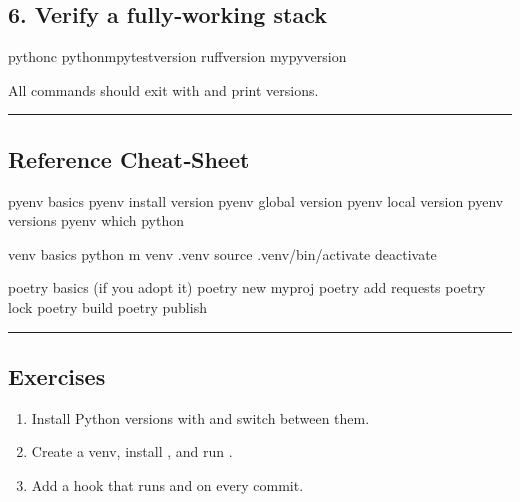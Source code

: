 \documentclass[a4paper,11pt,english]{sphinxmanual}
\begin{document}
\subsection{6. Verify a fully‑working stack}
\label{\detokenize{getting_started/installation:verify-a-fullyworking-stack}}
\begin{sphinxVerbatim}[commandchars=\\\{\}]
python\PYGZhy{}c
python\PYGZhy{}mpytest\PYGZhy{}\PYGZhy{}version
ruff\PYGZhy{}\PYGZhy{}version
mypy\PYGZhy{}\PYGZhy{}version
\end{sphinxVerbatim}

\sphinxAtStartPar
All commands should exit with  and print versions.


\bigskip\hrule\bigskip



\subsection{Reference Cheat‑Sheet}
\label{\detokenize{getting_started/installation:reference-cheatsheet}}
\begin{sphinxVerbatim}[commandchars=\\\{\}]
\PYGZsh{} pyenv basics
pyenv install \PYGZlt{}version\PYGZgt{}
pyenv global \PYGZlt{}version\PYGZgt{}
pyenv local \PYGZlt{}version\PYGZgt{}
pyenv versions
pyenv which python

\PYGZsh{} venv basics
python \PYGZhy{}m venv .venv
source .venv/bin/activate
deactivate

\PYGZsh{} poetry basics (if you adopt it)
poetry new myproj
poetry add requests
poetry lock
poetry build
poetry publish
\end{sphinxVerbatim}


\bigskip\hrule\bigskip



\subsection{Exercises}
\label{\detokenize{getting_started/installation:exercises}}\begin{enumerate}
%
\item {} 
\sphinxAtStartPar
Install  Python versions with  and switch between them.

\item {} 
\sphinxAtStartPar
Create a venv, install , and run .

\item {} 
\sphinxAtStartPar
Add a  hook that runs  and  on every commit.

\end{enumerate}
\end{document}

